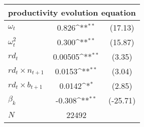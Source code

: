 {
\def\sym#1{\ifmmode^{#1}\else\(^{#1}\)\fi}
\begin{tabular}{l*{1}{cc}}
\hline\hline
\multicolumn{3}{c}{productivity evolution equation  }\\
\hline 
$\omega_t$       &       0.826\sym{**}&     (17.13)\\
$\omega_t^2$     &        0.300\sym{**}&     (15.87)\\

$rd_t$    &     0.00505\sym{**}&      (3.35)\\

$rd_t\times n_{t+1}$      &      0.0153\sym{**}&      (3.04)\\
$rd_t \times b_{t+1}$      &     0.0142\sym{*} &      (2.85)\\
$\beta_k$                  & -0.308\sym{**}    &     (-25.71)\\
\hline
\(N\)       &       22492        &            \\
\hline\hline
\end{tabular}
}
